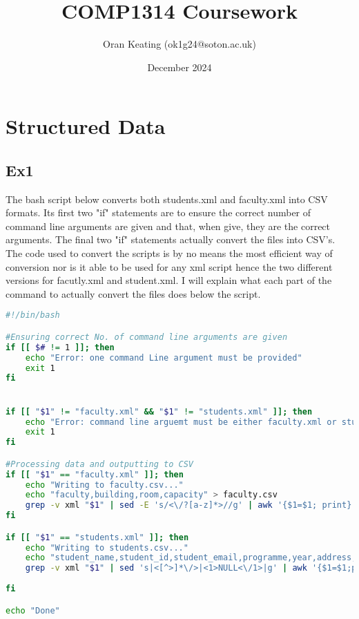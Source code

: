 \documentclass{article}
\title{COMP1314 Coursework}
\author{Oran Keating (ok1g24@soton.ac.uk)}
\date{December 2024}
\begin{document}
\maketitle

\section{Structured Data}

\subsection{Ex1}

The bash script below converts both students.xml and faculty.xml into CSV formats. Its first two "if" statements are to ensure the correct number of command line arguments are given and that, when give, they are the correct arguments. The final two "if" statements actually convert the files into CSV's. The code used to convert the scripts is by no means the most efficient way of conversion nor is it able to be used for any xml script hence the two different versions for facutly.xml and student.xml. I will explain what each part of the command to actually convert the files does below the script. 

\begin{lstlisting}[language=Bash, caption=XML to CSV script]
#!/bin/bash

#Ensuring correct No. of command line arguments are given
if [[ $# != 1 ]]; then
	echo "Error: one command Line argument must be provided"
	exit 1
fi


if [[ "$1" != "faculty.xml" && "$1" != "students.xml" ]]; then
	echo "Error: command line arguemt must be either faculty.xml or students.xml"
	exit 1
fi

#Processing data and outputting to CSV
if [[ "$1" == "faculty.xml" ]]; then
	echo "Writing to faculty.csv..."
	echo "faculty,building,room,capacity" > faculty.csv
	grep -v xml "$1" | sed -E 's/<\/?[a-z]*>//g' | awk '{$1=$1; print}' | tr -d '\r' | sed '/./ N; s/\n/,/g' | sed '/./ N; s/\n/,/g' | awk 'NF {printf"%s\n",$0}' >> faculty.csv
fi

if [[ "$1" == "students.xml" ]]; then
	echo "Writing to students.csv..."
	echo "student_name,student_id,student_email,programme,year,address,contact,module_id,module_name,module_leader,lecturer1,lecturer2,faculty,building,room,exam_mark,coursework1,coursework2,coursework3" > students.csv
	grep -v xml "$1" | sed 's|<[^>]*\/>|<1>NULL<\/1>|g' | awk '{$1=$1;print}'| sed -e 's|\(^[^< ]\)| \1|g' | tr -d '\r\n' | sed -e 's|\([^>]*,[^<]*\)|"\1"|g' | sed 's|<\/student>|\n|g' | sed 's|<[^\/]*>||g' | sed 's|<\/[^>]*>|,|g' | sed 's|,$||g' >> students.csv
	
fi

echo "Done"

\end{lstlisting}
\end{document}

